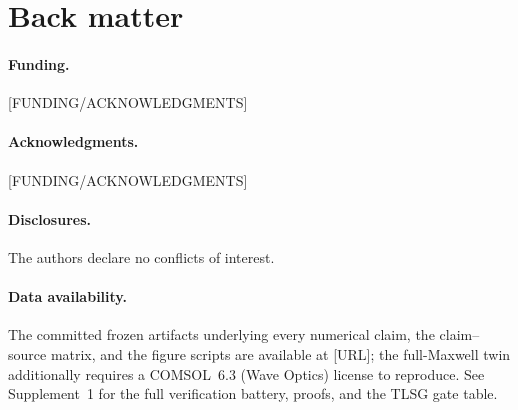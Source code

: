 \documentclass[10pt,twocolumn]{article}
\theoremstyle{plain}
\theoremstyle{definition}
\begin{document}
\section*{Back matter}
\paragraph{Funding.}[FUNDING/ACKNOWLEDGMENTS]
\paragraph{Acknowledgments.}[FUNDING/ACKNOWLEDGMENTS]
\paragraph{Disclosures.}The authors declare no conflicts of interest.
\paragraph{Data availability.}The committed frozen artifacts underlying every
numerical claim, the claim--source matrix, and the figure scripts are available at
[URL]; the full-Maxwell twin additionally requires a COMSOL~6.3 (Wave Optics)
license to reproduce. See Supplement~1 for the full verification battery, proofs, and
the TLSG gate table.
\end{document}
